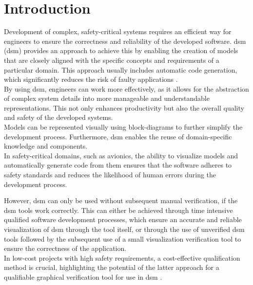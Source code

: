 \chapter{Introduction}
\label{chp:introduction}
Development of complex, safety-critical systems requires an efficient way for engineers to ensure the correctness and reliability of the developed software. \acrlong{dsm} (\acrshort{dsm}) provides an approach to achieve this by enabling the creation of models that are closely aligned with the specific concepts and requirements of a particular domain. This approach usually includes automatic code generation, which significantly reduces the risk of faulty applications \cite{waldvogel_2022}.\\
By using \acrshort{dsm}, engineers can work more effectively, as it allows for the abstraction of complex system details into more manageable and understandable representations. This not only enhances productivity but also the overall quality and safety of the developed systems.\\
Models can be represented visually using block-diagrams to further simplify the development process. Furthermore, \acrshort{dsm} enables the reuse of domain-specific knowledge and components.\\
In safety-critical domains, such as avionics, the ability to visualize models and automatically generate code from them ensures that the software adheres to safety standards and reduces the likelihood of human errors during the development process.

However, \acrshort{dsm} can only be used without subsequent manual verification, if the \acrshort{dsm} tools work correctly. This can either be achieved through time intensive qualified software development processes, which ensure an accurate and reliable visualization of \acrshort{dsm} through the tool itself, or through the use of unverified \acrshort{dsm} tools followed by the subsequent use of a small visualization verification tool to ensure the correctness of the application.\\
In low-cost projects with high safety requirements, a cost-effective qualification method is crucial, highlighting the potential of the latter approach for a qualifiable graphical verification tool for use in \acrshort{dsm} \cite{waldvogel_annighoefer_models_2024}.


